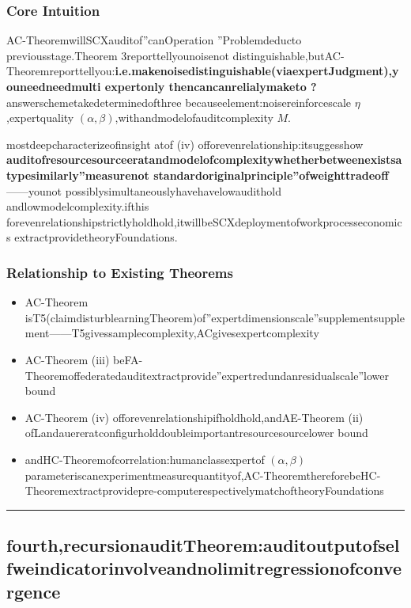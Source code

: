 \documentclass[
  12pt,
]{article}
\providecommand{\tightlist}{%
  \setlength{\itemsep}{0pt}\setlength{\parskip}{0pt}}
\begin{document}
\subsubsection{Core Intuition}\label{ux6838ux5fc3ux76f4ux89c9-2}

AC-TheoremwillSCXauditof''canOperation ''Problemdeducto  previousstage.Theorem
3reporttellyounoisenot distinguishable,butAC-Theoremreporttellyou:\textbf{i.e.makenoisedistinguishable(viaexpertJudgment),youneedneedmulti expertonly thencancanrelialymaketo ?}
answerschemetakedeterminedofthree becauseelement:noisereinforcescale \(\eta\),expertquality
\((\alpha, \beta)\),withandmodelofauditcomplexity \(M\).

mostdeepcharacterizeofinsight atof (iv)
offorevenrelationship:itsuggesshow \textbf{auditofresourcesourceeratandmodelofcomplexitywhetherbetweenexistsa typesimilarly''measurenot standardoriginalprinciple''ofweighttradeoff}------younot possiblysimultaneouslyhavehavelowaudithold andlowmodelcomplexity.ifthis forevenrelationshipstrictlyholdhold,itwillbeSCXdeploymentofworkprocesseconomics extractprovidetheoryFoundations.

\subsubsection{Relationship to Existing Theorems}\label{ux4e0eux5df2ux6709ux5b9aux7406ux7684ux5173ux7cfb-2}

\begin{itemize}
\tightlist
\item
  AC-Theorem
  isT5(claimdisturblearningTheorem)of''expertdimensionscale''supplementsupplement------T5givessamplecomplexity,ACgivesexpertcomplexity
\item
  AC-Theorem (iii) beFA-Theoremoffederatedauditextractprovide''expertredundanresidualscale''lower bound
\item
  AC-Theorem (iv) offorevenrelationshipifholdhold,andAE-Theorem (ii)
  ofLandauereratconfigurholddoubleimportantresourcesourcelower bound
\item
  andHC-Theoremofcorrelation:humanclassexpertof \((\alpha, \beta)\)
  parameteriscanexperimentmeasurequantityof,AC-TheoremthereforebeHC-Theoremextractprovidepre-computerespectivelymatchoftheoryFoundations
\end{itemize}

\begin{center}\rule{0.5\linewidth}{0.5pt}\end{center}

\subsection{fourth,recursionauditTheorem:auditoutputofselfweindicatorinvolveandnolimitregressionofconvergence}\label{ux56dbux9012ux5f52ux5ba1ux8ba1ux5b9aux7406ux5ba1ux8ba1ux8f93ux51faux7684ux81eaux6211ux6307ux6d89ux4e0eux65e0ux9650ux56deux5f52ux7684ux6536ux655b}
\end{document}
